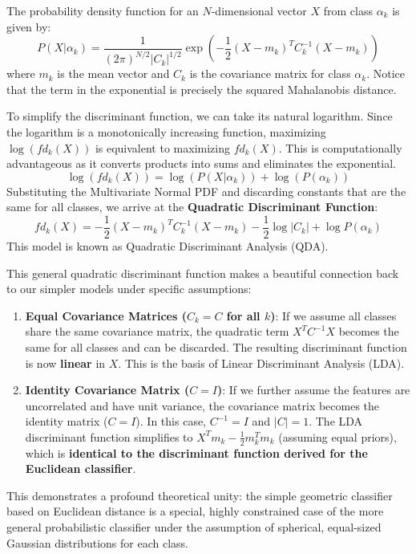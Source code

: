 The probability density function for an $N$-dimensional vector $X$ from class $\alpha_k$ is given by:
$$ P(X | \alpha_k) = \frac{1}{(2\pi)^{N/2} |C_k|^{1/2}} \exp\left(-\frac{1}{2}(X - m_k)^T C_k^{-1} (X - m_k)\right) $$
where $m_k$ is the mean vector and $C_k$ is the covariance matrix for class $\alpha_k$. Notice that the term in the exponential is precisely the squared Mahalanobis distance.

To simplify the discriminant function, we can take its natural logarithm. Since the logarithm is a monotonically increasing function, maximizing $\log(fd_k(X))$ is equivalent to maximizing $fd_k(X)$. This is computationally advantageous as it converts products into sums and eliminates the exponential.
$$ \log(fd_k(X)) = \log(P(X | \alpha_k)) + \log(P(\alpha_k)) $$
Substituting the Multivariate Normal PDF and discarding constants that are the same for all classes, we arrive at the \textbf{Quadratic Discriminant Function}:
$$ fd_k(X) = -\frac{1}{2}(X - m_k)^T C_k^{-1} (X - m_k) - \frac{1}{2}\log|C_k| + \log P(\alpha_k) $$
This model is known as Quadratic Discriminant Analysis (QDA).

\begin{remark}
This general quadratic discriminant function makes a beautiful connection back to our simpler models under specific assumptions:
\begin{enumerate}
    \item \textbf{Equal Covariance Matrices ($C_k = C$ for all $k$)}: If we assume all classes share the same covariance matrix, the quadratic term $X^T C^{-1} X$ becomes the same for all classes and can be discarded. The resulting discriminant function is now \textbf{linear} in $X$. This is the basis of Linear Discriminant Analysis (LDA).
    \item \textbf{Identity Covariance Matrix ($C = I$)}: If we further assume the features are uncorrelated and have unit variance, the covariance matrix becomes the identity matrix ($C=I$). In this case, $C^{-1}=I$ and $|C|=1$. The LDA discriminant function simplifies to $X^T m_k - \frac{1}{2}m_k^T m_k$ (assuming equal priors), which is \textbf{identical to the discriminant function derived for the Euclidean classifier}.
\end{enumerate}
This demonstrates a profound theoretical unity: the simple geometric classifier based on Euclidean distance is a special, highly constrained case of the more general probabilistic classifier under the assumption of spherical, equal-sized Gaussian distributions for each class.
\end{remark}
